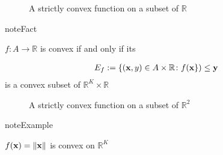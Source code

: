 \documentclass[letterpaper,10pt,english]{jupyterBook}
\begin{document}
\begin{figure}[htbp]
\centering
\capstart

\noindent{}
\caption{A strictly convex function on a subset of \(\mathbb{R}\)}\label{\detokenize{06.optimization_fundamentals:id10}}\end{figure}

\begin{sphinxadmonition}{note}{Fact}

\sphinxAtStartPar
\(f \colon A \to \mathbb{R}\) is convex if and only if its 
\end{sphinxadmonition}
\begin{equation*}
\begin{split}
%
E_f := \{ ({\bf x}, y) \in A \times \mathbb{R} \colon f({\bf x \}) \leq y}
%
\end{split}
\end{equation*}
\sphinxAtStartPar
is a convex subset of \(\mathbb{R}^K \times \mathbb{R}\)

\begin{figure}[htbp]
\centering

\noindent{}
\end{figure}

\begin{figure}[htbp]
\centering
\capstart

\noindent{}
\caption{A strictly convex function on a subset of \(\mathbb{R}^2\)}\label{\detokenize{06.optimization_fundamentals:id11}}\end{figure}

\begin{sphinxadmonition}{note}{Example}

\sphinxAtStartPar
\(f({\bf x}) = \|{\bf x}\|\) is convex on \(\mathbb{R}^K\)
\end{sphinxadmonition}
\end{document}
